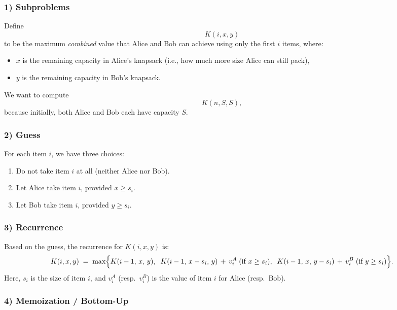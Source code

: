 \documentclass[11pt]{article}
\begin{document}
    \subsubsection*{1) Subproblems}
    
    Define 
    \[
    K(i, x, y)
    \]
    to be the maximum \emph{combined} value that Alice and Bob can achieve using only the first \(i\) items, where:
    \begin{itemize}
        \item \(x\) is the remaining capacity in Alice's knapsack (i.e., how much more size Alice can still pack),
        \item \(y\) is the remaining capacity in Bob's knapsack.
    \end{itemize}
    We want to compute 
    \[
    K(n, S, S),
    \]
    because initially, both Alice and Bob each have capacity \(S\).
    
    \subsubsection*{2) Guess}
    
    For each item \(i\), we have three choices:
    \begin{enumerate}
        \item Do not take item \(i\) at all (neither Alice nor Bob).
        \item Let Alice take item \(i\), provided \(x \ge s_i\).
        \item Let Bob take item \(i\), provided \(y \ge s_i\).
    \end{enumerate}
    
    \subsubsection*{3) Recurrence}
    
    Based on the guess, the recurrence for \(K(i,x,y)\) is:
    \[
    K(i,x,y) \;=\; \max\Bigl\{
        K(i-1,\,x,\,y),\;\;
        K(i-1,\,x - s_i,\,y) \,+\, v_i^A \;\text{(if } x \ge s_i),\;\;
        K(i-1,\,x,\,y - s_i) \,+\, v_i^B \;\text{(if } y \ge s_i)
    \Bigr\}.
    \]
    Here, \(s_i\) is the size of item \(i\), and \(v_i^A\) (resp.\ \(v_i^B\)) is the value of item \(i\) for Alice (resp.\ Bob).
    
    \subsubsection*{4) Memoization / Bottom-Up}
    
\end{document}
